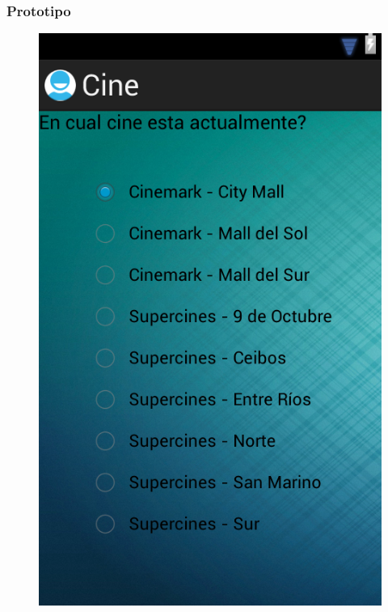 \documentclass{beamer}
\begin{document}
\begin{frame}[allowframbreaks]
\frametitle{Prototipo}
\begin{figure}[h]
\centering
\includegraphics[height=1.0\textheight]{comprar_cine.png}
\end{figure}
\end{frame}
\end{document}
